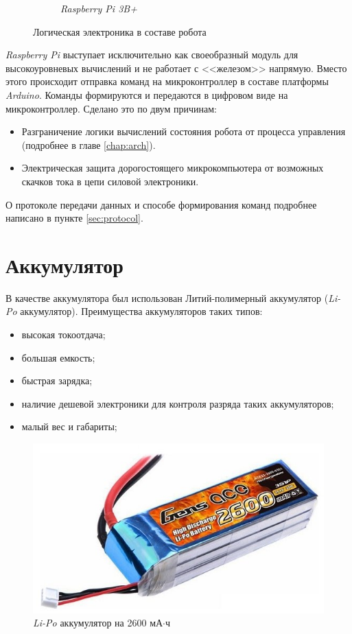 \begin{figure}[ht]
\begin{subfigure}[b]{0.45\textwidth}
        \caption{\textit{Raspberry Pi 3B+}}
    \end{subfigure}
     
    \caption{Логическая электроника в составе робота}
    \label{fig:leg_model}
\end{figure}

\textit{Raspberry Pi} выступает исключительно как своеобразный модуль для высокоуровневых вычислений и не работает с <<железом>> напрямую. Вместо этого происходит отправка команд на микроконтроллер в составе платформы \textit{Arduino}. Команды формируются и передаются в цифровом виде на микроконтроллер. Сделано это по двум причинам:
\begin{itemize}
    \item Разграничение логики вычислений состояния робота от процесса управления (подробнее в главе \ref{chap:arch}). %
    \item Электрическая защита дорогостоящего микрокомпьютера от возможных скачков тока в цепи силовой электроники.
\end{itemize}

О протоколе передачи данных и способе формирования команд подробнее написано в пункте \ref{sec:protocol}.

\section{Аккумулятор}
В качестве аккумулятора был использован Литий-полимерный аккумулятор (\textit{Li-Po} аккумулятор). Преимущества аккумуляторов таких типов:
\begin{itemize}
    \item высокая токоотдача;
    \item большая емкость;
    \item быстрая зарядка;
    \item наличие дешевой электроники для контроля разряда таких аккумуляторов;
    \item малый вес и габариты;
\end{itemize}

\begin{figure}[h]
    \centering
    \includegraphics[scale=1]{chapter_mechanics_construction/figure2.png}
    \caption{\textit{Li-Po} аккумулятор на 2600 мА$\cdot$ч}
    \label{}
\end{figure}

